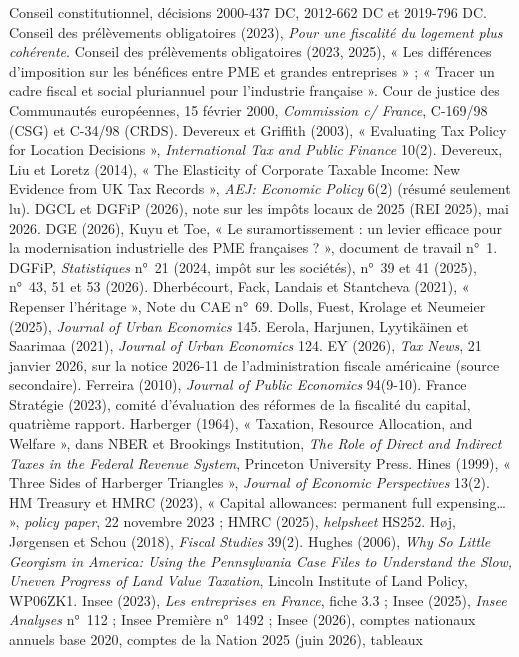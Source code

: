 \documentclass[11pt,a4paper]{article}
\begin{document}
{Conseil constitutionnel, décisions 2000-437 DC, 2012-662 DC et 2019-796 DC.
Conseil des prélèvements obligatoires (2023), \emph{Pour une fiscalité du logement plus cohérente}.
Conseil des prélèvements obligatoires (2023, 2025), « Les différences d'imposition sur les bénéfices entre PME
et grandes entreprises » ; « Tracer un cadre fiscal et social pluriannuel pour l'industrie française ».
Cour de justice des Communautés européennes, 15 février 2000, \emph{Commission c/ France}, C-169/98 (CSG) et C-34/98
(CRDS).
Devereux et Griffith (2003), « Evaluating Tax Policy for Location Decisions », \emph{International Tax and Public
Finance} 10(2).
Devereux, Liu et Loretz (2014), « The Elasticity of Corporate Taxable Income: New Evidence from UK Tax Records »,
\emph{AEJ: Economic Policy} 6(2) (résumé seulement lu).
DGCL et DGFiP (2026), note sur les impôts locaux de 2025 (REI 2025), mai 2026.
DGE (2026), Kuyu et Toe, « Le suramortissement : un levier efficace pour la modernisation industrielle des PME
françaises ? », document de travail n°~1.
DGFiP, \emph{Statistiques} n°~21 (2024, impôt sur les sociétés), n°~39 et 41 (2025), n°~43, 51 et 53 (2026).
Dherbécourt, Fack, Landais et Stantcheva (2021), « Repenser l'héritage », Note du CAE n°~69.
Dolls, Fuest, Krolage et Neumeier (2025), \emph{Journal of Urban Economics} 145.
Eerola, Harjunen, Lyytikäinen et Saarimaa (2021), \emph{Journal of Urban Economics} 124.
EY (2026), \emph{Tax News}, 21 janvier 2026, sur la notice 2026-11 de l'administration fiscale américaine (source
secondaire).
Ferreira (2010), \emph{Journal of Public Economics} 94(9-10).
France Stratégie (2023), comité d'évaluation des réformes de la fiscalité du capital, quatrième rapport.
Harberger (1964), « Taxation, Resource Allocation, and Welfare », dans NBER et Brookings Institution, \emph{The
Role of Direct and Indirect Taxes in the Federal Revenue System}, Princeton University Press.
Hines (1999), « Three Sides of Harberger Triangles », \emph{Journal of Economic Perspectives} 13(2).
HM Treasury et HMRC (2023), « Capital allowances: permanent full expensing… », \emph{policy paper}, 22 novembre 2023 ;
HMRC (2025), \emph{helpsheet} HS252.
Høj, Jørgensen et Schou (2018), \emph{Fiscal Studies} 39(2).
Hughes (2006), \emph{Why So Little Georgism in America: Using the Pennsylvania Case Files to Understand the Slow,
Uneven Progress of Land Value Taxation}, Lincoln Institute of Land Policy, WP06ZK1.
Insee (2023), \emph{Les entreprises en France}, fiche 3.3 ; Insee (2025), \emph{Insee Analyses} n°~112 ; Insee
Première n°~1492 ; Insee (2026), comptes nationaux annuels base 2020, comptes de la Nation 2025 (juin 2026), tableaux
}
\end{document}
